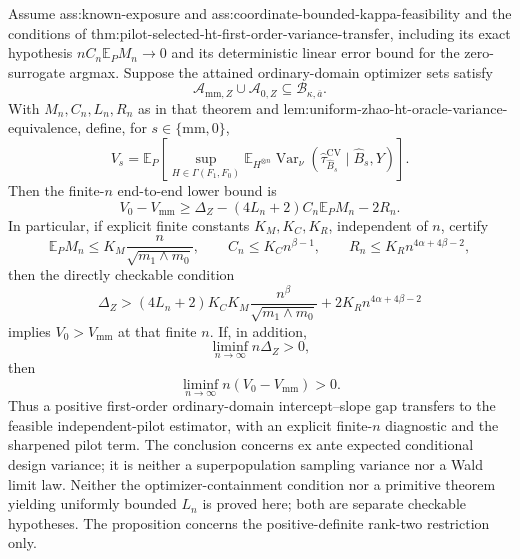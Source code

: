 Assume ass:known-exposure and ass:coordinate-bounded-kappa-feasibility and the conditions of thm:pilot-selected-ht-first-order-variance-transfer, including its exact hypothesis \(nC_n\mathbb E_PM_n\to0\) and its deterministic linear error bound for the zero-surrogate argmax.  Suppose the attained ordinary-domain optimizer sets satisfy
\[
\mathcal A_{\mathrm{mm},Z}\cup\mathcal A_{0,Z}
\subseteq\mathcal B_{\kappa,\overline a}.
\]
With \(M_n,C_n,L_n,R_n\) as in that theorem and lem:uniform-zhao-ht-oracle-variance-equivalence, define, for \(s\in\{\mathrm{mm},0\}\),
\[
V_s=
\mathbb E_P\left[
\sup_{H\in\Gamma(F_1,F_0)}
\mathbb E_{H^{\otimes n}}
\operatorname{Var}_\nu
(\widehat\tau_{\widehat B_s}^{\mathrm{CV}}\mid\widehat B_s,Y)
\right].
\]
Then the finite-\(n\) end-to-end lower bound is
\[
V_0-V_{\mathrm{mm}}
\ge
\Delta_Z-(4L_n+2)C_n\mathbb E_PM_n-2R_n.
\]
In particular, if explicit finite constants \(K_M,K_C,K_R\), independent of \(n\), certify
\[
\mathbb E_PM_n\le K_M\frac{n}{\sqrt{m_1\wedge m_0}},
\qquad
C_n\le K_Cn^{\beta-1},
\qquad
R_n\le K_Rn^{4\alpha+4\beta-2},
\]
then the directly checkable condition
\[
\Delta_Z>
(4L_n+2)K_CK_M
\frac{n^{\beta}}{\sqrt{m_1\wedge m_0}}
+2K_Rn^{4\alpha+4\beta-2}
\]
implies \(V_0>V_{\mathrm{mm}}\) at that finite \(n\).  If, in addition,
\[
\liminf_{n\to\infty}n\Delta_Z>0,
\]
then
\[
\liminf_{n\to\infty}n(V_0-V_{\mathrm{mm}})>0.
\]
Thus a positive first-order ordinary-domain intercept--slope gap transfers to the feasible independent-pilot estimator, with an explicit finite-\(n\) diagnostic and the sharpened pilot term.  The conclusion concerns ex ante expected conditional design variance; it is neither a superpopulation sampling variance nor a Wald limit law.  Neither the optimizer-containment condition nor a primitive theorem yielding uniformly bounded \(L_n\) is proved here; both are separate checkable hypotheses.  The proposition concerns the positive-definite rank-two restriction only.
